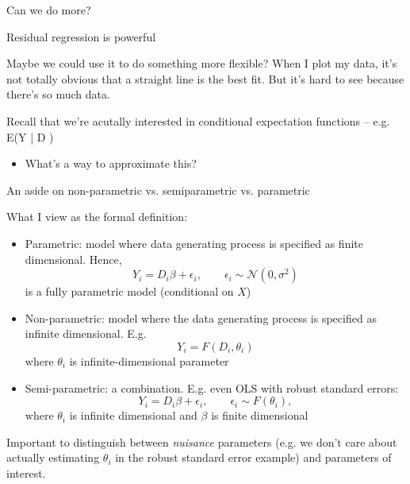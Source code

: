 \documentclass[notes,11pt, aspectratio=169]{beamer}
\newenvironment{wideitemize}{\itemize\addtolength{\itemsep}{10pt}}{\enditemize}
\begin{document}
\begin{frame}{Can we do more?}
  \begin{wideitemize}
  \item  Residual regression is powerful
  \item Maybe we could use it to do something more flexible?  When I
    plot my data, it's not totally obvious that a straight line is the
    best fit. But it's hard to see because there's so much data.
  \item   Recall that we're acutally interested in conditional expectation functions -- e.g. E(Y | D )
    \begin{itemize}
    \item   What's a way to  approximate this?
    \end{itemize}
  \end{wideitemize}
\end{frame}

\begin{frame}{An aside on non-parametric vs. semiparametric vs. parametric}
  \begin{wideitemize}
  \item What I view as the formal definition:
    \begin{itemize}
    \item Parametric: model where data generating process is specified as finite dimensional. Hence,
      $$ Y_{i} = D_{i}\beta + \epsilon_{i}, \qquad \epsilon_{i} \sim \mathcal{N}(0, \sigma^{2})$$
      is a fully parametric model (conditional on $X$)
    \item Non-parametric: model where the data generating process is specified as infinite dimensional. E.g.
      $$ Y_{i} = F(D_{i},\theta_{i})$$
      where $\theta_{i}$ is infinite-dimensional parameter
    \item Semi-parametric: a combination. E.g. even OLS with robust standard errors:
      $$ Y_{i} = D_{i}\beta + \epsilon_{i}, \qquad \epsilon_{i} \sim F(\theta_{i}),$$
      where $\theta_{i}$ is infinite dimensional and $\beta$ is finite dimensional
    \end{itemize}
  \item Important to distinguish between \emph{nuisance} parameters
    (e.g. we don't care about actually estimating $\theta_{i}$ in the
    robust standard error example) and parameters of interest. 
  \end{wideitemize}
\end{frame}
\end{document}
